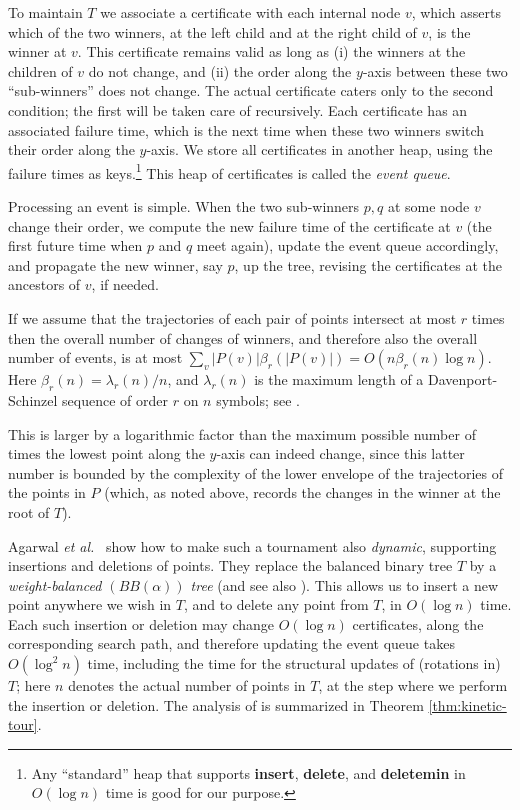 \documentclass[letter,11pt]{article}
\begin{document}
To maintain $T$ we associate a certificate with each internal node $v$, which
asserts which of the two winners, at the left child and at the
right child of $v$, is the winner at $v$. This certificate remains
valid as long as (i) the winners at the children of $v$ do not change,
and (ii) the order along the $y$-axis between these two
``sub-winners'' does not change. The actual certificate caters
only to the second
condition; the first will be taken care of recursively.
Each certificate has an associated failure time, which is the next time
when these two winners switch their order along the $y$-axis.
We store all certificates in another heap, using the failure times
as keys.\footnote{Any ``standard'' heap that supports
  {\bf insert}, {\bf delete}, and {\bf deletemin} in $O(\log n)$
  time is good for our purpose.}
This heap of certificates is called the {\em event queue}.


Processing an event is simple. When the two sub-winners $p,q$ at some node $v$ change their order, we compute the new failure time of the certificate at $v$ (the first future time when $p$ and $q$ meet again), update the event queue accordingly, and propagate the new winner, say $p$, up the tree, revising the certificates at the ancestors of $v$, if needed.

If we assume that the  trajectories of each pair of points intersect at most $r$
times then
the overall number of changes of winners, and
therefore also the overall number of events, is at most
$\sum_v |P(v)| \beta_r(|P(v)|)= O(n \beta_r(n) \log n)$. Here
$\beta_r(n)=\lambda_r(n)/n$, and $\lambda_r(n)$ is the maximum length of a Davenport-Schinzel sequence
of order $r$ on $n$ symbols; see \cite{SA95}.

This is larger by a logarithmic factor than the maximum possible
number of times the lowest point along the $y$-axis can indeed change,
since this latter number is bounded by the complexity of the lower
envelope of the trajectories of the points in $P$ (which, as noted above, records the changes in the winner at the root of $T$).

Agarwal {\em et al.}~\cite{KineticNeighbors} show how to make
such a tournament also {\em dynamic\/}, supporting insertions and deletions of points. They replace the balanced binary tree $T$ by
 a {\em weight-balanced $(BB(\alpha))$ tree} \cite{NR73}
(and see also \cite{Mehlhorn}).  This allows us to insert a new point
anywhere we wish in $T$, and to delete any point from $T$,
in $O(\log n)$ time. Each such insertion or deletion may
change $O(\log n)$ certificates, along the corresponding search path,
and therefore updating the event queue takes $O(\log^2 n)$ time, including the time for the
structural updates of (rotations in) $T$; here $n$ denotes the
actual number of points in $T$, at the step where we perform
the insertion or deletion. The analysis of \cite{KineticNeighbors} is summarized in Theorem \ref{thm:kinetic-tour}.
\end{document}
